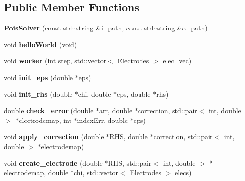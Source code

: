 \subsection*{Public Member Functions}
\begin{DoxyCompactItemize}
\item 
{\bfseries Pois\+Solver} (const std\+::string \&i\+\_\+path, const std\+::string \&o\+\_\+path)\hypertarget{classphys_1_1PoisSolver_a302c2e4344ef0f5d0fb86e409b68ae8d}{}\label{classphys_1_1PoisSolver_a302c2e4344ef0f5d0fb86e409b68ae8d}

\item 
void {\bfseries hello\+World} (void)\hypertarget{classphys_1_1PoisSolver_a17a0fb2e838bcb7040adceffc841d8bc}{}\label{classphys_1_1PoisSolver_a17a0fb2e838bcb7040adceffc841d8bc}

\item 
void {\bfseries worker} (int step, std\+::vector$<$ \hyperlink{classElectrodes}{Electrodes} $>$ elec\+\_\+vec)\hypertarget{classphys_1_1PoisSolver_a2ac57100d343c0532e4d18b1fda17a90}{}\label{classphys_1_1PoisSolver_a2ac57100d343c0532e4d18b1fda17a90}

\item 
void {\bfseries init\+\_\+eps} (double $\ast$eps)\hypertarget{classphys_1_1PoisSolver_a8388409cd07698c9b6c55c4056d7d3d7}{}\label{classphys_1_1PoisSolver_a8388409cd07698c9b6c55c4056d7d3d7}

\item 
void {\bfseries init\+\_\+rhs} (double $\ast$chi, double $\ast$eps, double $\ast$rhs)\hypertarget{classphys_1_1PoisSolver_a004e5f9f2ff6f270e6b3a002133eb3e5}{}\label{classphys_1_1PoisSolver_a004e5f9f2ff6f270e6b3a002133eb3e5}

\item 
double {\bfseries check\+\_\+error} (double $\ast$arr, double $\ast$correction, std\+::pair$<$ int, double $>$ $\ast$electrodemap, int $\ast$index\+Err, double $\ast$eps)\hypertarget{classphys_1_1PoisSolver_abc9a6855ffef1c0aec151b0d76f2d1b8}{}\label{classphys_1_1PoisSolver_abc9a6855ffef1c0aec151b0d76f2d1b8}

\item 
void {\bfseries apply\+\_\+correction} (double $\ast$R\+HS, double $\ast$correction, std\+::pair$<$ int, double $>$ $\ast$electrodemap)\hypertarget{classphys_1_1PoisSolver_a64477a042f6afa6d63ff3b98bcdd5950}{}\label{classphys_1_1PoisSolver_a64477a042f6afa6d63ff3b98bcdd5950}

\item 
void {\bfseries create\+\_\+electrode} (double $\ast$R\+HS, std\+::pair$<$ int, double $>$ $\ast$electrodemap, double $\ast$chi, std\+::vector$<$ \hyperlink{classElectrodes}{Electrodes} $>$ elecs)\hypertarget{classphys_1_1PoisSolver_a597fceca244146df123b7f70c9c7a5a2}{}\label{classphys_1_1PoisSolver_a597fceca244146df123b7f70c9c7a5a2}


\end{DoxyCompactItemize}
